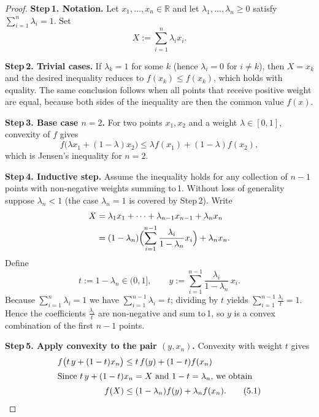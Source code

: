 \begin{proof}
\textbf{Step 1. Notation.}  
Let \(x_{1},\dots ,x_{n}\in\mathbb{R}\) and let \(\lambda_{1},\dots ,\lambda_{n}\ge 0\) satisfy \(\displaystyle\sum_{i=1}^{n}\lambda_{i}=1\).  
Set  
\[
X:=\sum_{i=1}^{n}\lambda_{i}x_{i}.
\]

\textbf{Step 2. Trivial cases.}  
If \(\lambda_{k}=1\) for some \(k\) (hence \(\lambda_{i}=0\) for \(i\neq k\)), then \(X=x_{k}\) and the desired inequality reduces to \(f(x_{k})\le f(x_{k})\), which holds with equality.  
The same conclusion follows when all points that receive positive weight are equal, because both sides of the inequality are then the common value \(f(x)\).

\textbf{Step 3. Base case \(n=2\).}  
For two points \(x_{1},x_{2}\) and a weight \(\lambda\in[0,1]\), convexity of \(f\) gives  
\[
f\bigl(\lambda x_{1}+(1-\lambda)x_{2}\bigr)\le
\lambda f(x_{1})+(1-\lambda)f(x_{2}),
\]
which is Jensen’s inequality for \(n=2\).

\textbf{Step 4. Inductive step.}  
Assume the inequality holds for any collection of \(n-1\) points with non‑negative weights summing to 1.  
Without loss of generality suppose \(\lambda_{n}<1\) (the case \(\lambda_{n}=1\) is covered by Step 2).  Write
\begin{align*}
X &=\lambda_{1}x_{1}+\cdots +\lambda_{n-1}x_{n-1}+\lambda_{n}x_{n}\\
  &= (1-\lambda_{n})\Bigl(\sum_{i=1}^{n-1}\frac{\lambda_{i}}{1-\lambda_{n}}x_{i}\Bigr)+\lambda_{n}x_{n}.
\end{align*}
Define
\[
t:=1-\lambda_{n}\in(0,1],\qquad 
y:=\sum_{i=1}^{n-1}\frac{\lambda_{i}}{1-\lambda_{n}}\,x_{i}.
\]
Because \(\sum_{i=1}^{n}\lambda_{i}=1\) we have \(\sum_{i=1}^{n-1}\lambda_{i}=t\); dividing by \(t\) yields \(\sum_{i=1}^{n-1}\frac{\lambda_{i}}{t}=1\).  Hence the coefficients \(\frac{\lambda_{i}}{t}\) are non‑negative and sum to 1, so \(y\) is a convex combination of the first \(n-1\) points.

\textbf{Step 5. Apply convexity to the pair \((y,x_{n})\).}  
Convexity with weight \(t\) gives
\begin{align*}
f\bigl(t\,y+(1-t)x_{n}\bigr)&\le t\,f(y)+(1-t)f(x_{n})\\
\intertext{Since \(t\,y+(1-t)x_{n}=X\) and \(1-t=\lambda_{n}\), we obtain}
f(X)&\le (1-\lambda_{n})f(y)+\lambda_{n}f(x_{n}). \tag{5.1}
\end{align*}


\end{proof}
